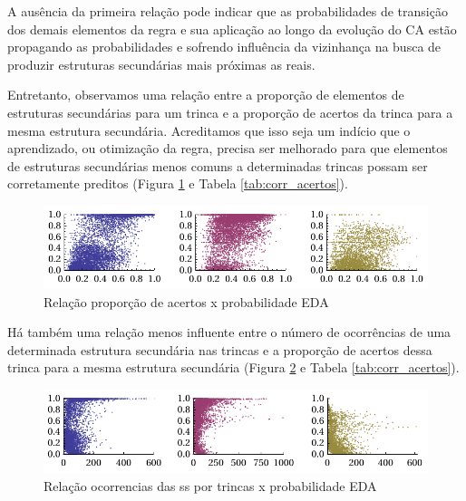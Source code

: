 A ausência da primeira relação pode indicar que as probabilidades de transição dos demais elementos da regra e sua aplicação ao longo da evolução do CA estão propagando as probabilidades e sofrendo influência da vizinhança na busca de produzir estruturas secundárias mais próximas as reais. 

Entretanto, observamos uma relação entre a proporção de elementos de estruturas secundárias para um trinca e a proporção de acertos da trinca para a mesma estrutura secundária. Acreditamos que isso seja um indício que o aprendizado, ou otimização da regra, precisa ser melhorado para que elementos de estruturas secundárias menos comuns a determinadas trincas possam ser corretamente preditos (Figura \ref{fig:prop_acerto} e Tabela \ref{tab:corr_acertos}).  

\begin{figure}
  \centering
  \includegraphics[width=1\textwidth]{figures/prop_acerto.pdf}
  \caption{Relação proporção de acertos x probabilidade EDA}
        \label{fig:prop_acerto}
\end{figure}

Há também uma relação menos influente entre o número de ocorrências de uma determinada estrutura secundária nas trincas e a proporção de acertos dessa trinca para a mesma estrutura secundária (Figura \ref{fig:occ_acerto} e Tabela \ref{tab:corr_acertos}).

\begin{figure}
  \centering
  \includegraphics[width=1\textwidth]{figures/occ_acerto.pdf}
  \caption{Relação ocorrencias das ss por trincas x probabilidade EDA}
        \label{fig:occ_acerto}
\end{figure}


